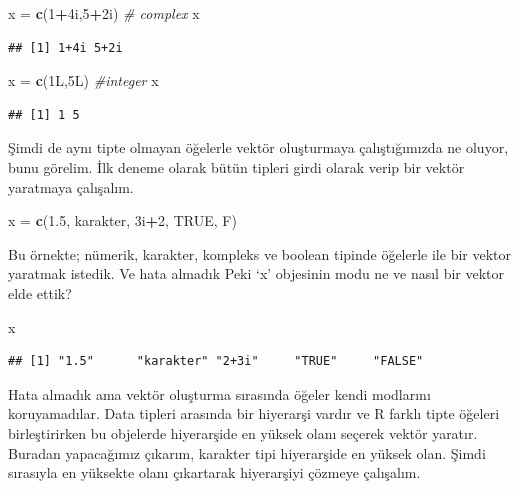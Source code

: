 \documentclass[
]{book}
\newenvironment{Shaded}{\begin{snugshade}}{\end{snugshade}}
\newcommand{\CommentTok}[1]{\textcolor[rgb]{0.56,0.35,0.01}{\textit{#1}}}
\newcommand{\DecValTok}[1]{\textcolor[rgb]{0.00,0.00,0.81}{#1}}
\newcommand{\FloatTok}[1]{\textcolor[rgb]{0.00,0.00,0.81}{#1}}
\newcommand{\KeywordTok}[1]{\textcolor[rgb]{0.13,0.29,0.53}{\textbf{#1}}}
\newcommand{\NormalTok}[1]{#1}
\newcommand{\OperatorTok}[1]{\textcolor[rgb]{0.81,0.36,0.00}{\textbf{#1}}}
\newcommand{\OtherTok}[1]{\textcolor[rgb]{0.56,0.35,0.01}{#1}}
\newcommand{\StringTok}[1]{\textcolor[rgb]{0.31,0.60,0.02}{#1}}
\begin{document}
\begin{Shaded}
\begin{Highlighting}[]
\NormalTok{x =}\StringTok{ }\KeywordTok{c}\NormalTok{(}\DecValTok{1}\OperatorTok{+}\NormalTok{4i,}\DecValTok{5}\OperatorTok{+}\NormalTok{2i) }\CommentTok{\# complex}
\NormalTok{x}
\end{Highlighting}
\end{Shaded}

\begin{verbatim}
## [1] 1+4i 5+2i
\end{verbatim}

\begin{Shaded}
\begin{Highlighting}[]
\NormalTok{x =}\StringTok{ }\KeywordTok{c}\NormalTok{(1L,5L) }\CommentTok{\#integer}
\NormalTok{x}
\end{Highlighting}
\end{Shaded}

\begin{verbatim}
## [1] 1 5
\end{verbatim}

Şimdi de aynı tipte olmayan öğelerle vektör oluşturmaya çalıştığımızda ne oluyor, bunu görelim. İlk deneme olarak bütün tipleri girdi olarak verip bir vektör yaratmaya çalışalım.

\begin{Shaded}
\begin{Highlighting}[]
\NormalTok{x =}\StringTok{ }\KeywordTok{c}\NormalTok{(}\FloatTok{1.5}\NormalTok{, }\StringTok{\textquotesingle{}karakter\textquotesingle{}}\NormalTok{, 3i}\OperatorTok{+}\DecValTok{2}\NormalTok{, }\OtherTok{TRUE}\NormalTok{, F)}
\end{Highlighting}
\end{Shaded}

Bu örnekte; nümerik, karakter, kompleks ve boolean tipinde öğelerle ile bir vektor yaratmak istedik. Ve hata almadık Peki `x' objesinin modu ne ve nasıl bir vektor elde ettik?

\begin{Shaded}
\begin{Highlighting}[]
\NormalTok{x}
\end{Highlighting}
\end{Shaded}

\begin{verbatim}
## [1] "1.5"      "karakter" "2+3i"     "TRUE"     "FALSE"
\end{verbatim}

Hata almadık ama vektör oluşturma sırasında öğeler kendi modlarını koruyamadılar. Data tipleri arasında bir hiyerarşi vardır ve R farklı tipte öğeleri birleştirirken bu objelerde hiyerarşide en yüksek olanı seçerek vektör yaratır. Buradan yapacağımız çıkarım, karakter tipi hiyerarşide en yüksek olan. Şimdi sırasıyla en yüksekte olanı çıkartarak hiyerarşiyi çözmeye çalışalım.
\end{document}
